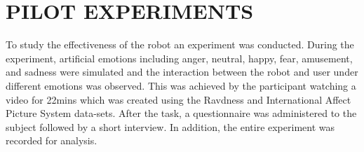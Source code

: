 \documentclass[letterpaper, 10 pt, conference]{ieeeconf}  %
\begin{document}


\section{PILOT EXPERIMENTS}

To study the effectiveness of the robot an experiment was conducted. During
the experiment, artificial emotions including anger, neutral, happy, fear, amusement, and sadness were simulated and the interaction between the robot and user under different emotions was observed. This was achieved by the participant watching a video for 22mins which was created using the Ravdness and International Affect Picture System data-sets. After the task, a questionnaire was administered to the subject followed by a short interview. In addition, the entire experiment was recorded for analysis. 



\end{document}

